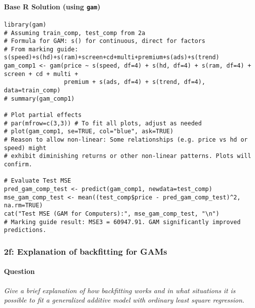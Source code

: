 \documentclass[12pt,a4paper]{article}
\newcommand{\Rpackage}[1]{\texttt{#1}} %
\begin{document}
        \paragraph{Base R Solution (using \Rpackage{gam})}
\begin{lstlisting}
library(gam)
# Assuming train_comp, test_comp from 2a
# Formula for GAM: s() for continuous, direct for factors
# From marking guide: s(speed)+s(hd)+s(ram)+screen+cd+multi+premium+s(ads)+s(trend)
gam_comp1 <- gam(price ~ s(speed, df=4) + s(hd, df=4) + s(ram, df=4) + screen + cd + multi +
                 premium + s(ads, df=4) + s(trend, df=4), data=train_comp)
# summary(gam_comp1)

# Plot partial effects
# par(mfrow=c(3,3)) # To fit all plots, adjust as needed
# plot(gam_comp1, se=TRUE, col="blue", ask=TRUE)
# Reason to allow non-linear: Some relationships (e.g. price vs hd or speed) might
# exhibit diminishing returns or other non-linear patterns. Plots will confirm.

# Evaluate Test MSE
pred_gam_comp_test <- predict(gam_comp1, newdata=test_comp)
mse_gam_comp_test <- mean((test_comp$price - pred_gam_comp_test)^2, na.rm=TRUE)
cat("Test MSE (GAM for Computers):", mse_gam_comp_test, "\n")
# Marking guide result: MSE3 = 60947.91. GAM significantly improved predictions.
\end{lstlisting}

    \subsubsection{2f: Explanation of backfitting for GAMs}
        \paragraph{Question}
        \textit{Give a brief explanation of how backfitting works and in what situations it is possible to fit a generalized additive model with ordinary least square regression.}
\end{document}
